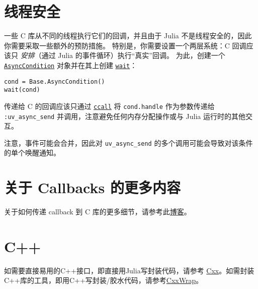 \section{线程安全}



一些 C 库从不同的线程执行它们的回调，并且由于 Julia 不是线程安全的，因此你需要采取一些额外的预防措施。 特别是，你需要设置一个两层系统：C 回调应该只 \emph{安排}（通过 Julia 的事件循环）执行“真实”回调。 为此，创建一个 \hyperlink{6110056827764884232}{\texttt{AsyncCondition}} 对象并在其上创建 \hyperlink{13761789780433862250}{\texttt{wait}}：




\begin{verbatim}
cond = Base.AsyncCondition()
wait(cond)
\end{verbatim}



传递给 C 的回调应该只通过 \hyperlink{14245046751182637566}{\texttt{ccall}} 将 \texttt{cond.handle} 作为参数传递给 \texttt{:uv\_async\_send} 并调用，注意避免任何内存分配操作或与 Julia 运行时的其他交互。



注意，事件可能会合并，因此对 \texttt{uv\_async\_send} 的多个调用可能会导致对该条件的单个唤醒通知。



\hypertarget{9551685449391366384}{}


\section{关于 Callbacks 的更多内容}



关于如何传递 callback 到 C 库的更多细节，请参考此\href{https://julialang.org/blog/2013/05/callback}{博客}。



\hypertarget{4039606750368114245}{}


\section{C++}



如需要直接易用的C++接口，即直接用Julia写封装代码，请参考 \href{https://github.com/Keno/Cxx.jl}{Cxx}。如需封装C++库的工具，即用C++写封装/胶水代码，请参考\href{https://github.com/JuliaInterop/CxxWrap.jl}{CxxWrap}。





